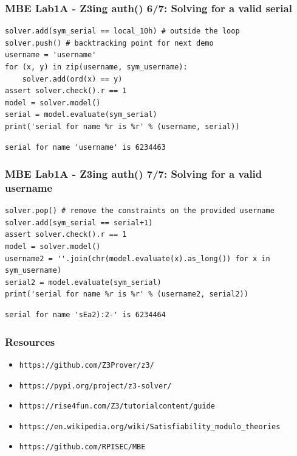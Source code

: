 \documentclass[aspectratio=169]{beamer}
\begin{document}
\begin{frame}[fragile]
\frametitle{MBE Lab1A - Z3ing auth() 6/7: Solving for a valid serial}
\begin{Verbatim}[fontsize=\scriptsize, frame=single]
solver.add(sym_serial == local_10h) # outside the loop
solver.push() # backtracking point for next demo
username = 'username'
for (x, y) in zip(username, sym_username):
    solver.add(ord(x) == y)
assert solver.check().r == 1
model = solver.model()
serial = model.evaluate(sym_serial)
print('serial for name %r is %r' % (username, serial))
\end{Verbatim}
\begin{Verbatim}[fontsize=\scriptsize, frame=single]
serial for name 'username' is 6234463
\end{Verbatim}
\end{frame}


\begin{frame}[fragile]
\frametitle{MBE Lab1A - Z3ing auth() 7/7: Solving for a valid username}
\begin{Verbatim}[fontsize=\scriptsize, frame=single]
solver.pop() # remove the constraints on the provided username
solver.add(sym_serial == serial+1)
assert solver.check().r == 1
model = solver.model()
username2 = ''.join(chr(model.evaluate(x).as_long()) for x in sym_username)
serial2 = model.evaluate(sym_serial)
print('serial for name %r is %r' % (username2, serial2))
\end{Verbatim}
\begin{Verbatim}[fontsize=\scriptsize, frame=single]
serial for name 'sEa2):2-' is 6234464
\end{Verbatim}
\end{frame}

\begin{frame}[fragile]
\frametitle{Resources}
\begin{itemize}
\item \verb|https://github.com/Z3Prover/z3/|
\item \verb|https://pypi.org/project/z3-solver/|
\item \verb|https://rise4fun.com/Z3/tutorialcontent/guide|
\item \verb|https://en.wikipedia.org/wiki/Satisfiability_modulo_theories|
\item \verb|https://github.com/RPISEC/MBE|
\end{itemize}
\end{frame}
\end{document}
